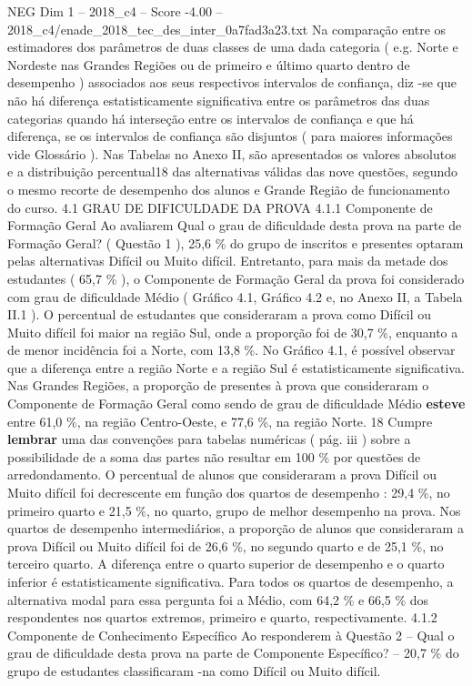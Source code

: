\begin{textsample}{NEG Dim 1 – 2018\_c4 – Score -4.00 – 2018\_c4/enade\_2018\_tec\_des\_inter\_0a7fad3a23.txt}
Na comparação entre os estimadores dos parâmetros de duas classes de uma dada categoria ( e.g.
Norte e Nordeste nas Grandes Regiões ou de primeiro e último quarto dentro de desempenho ) associados aos seus respectivos intervalos de confiança, diz -se que não há diferença estatisticamente significativa entre os parâmetros das duas categorias quando há interseção entre os intervalos de confiança e que há diferença, se os intervalos de confiança são disjuntos ( para maiores informações vide Glossário ).
Nas Tabelas no Anexo II, são apresentados os valores absolutos e a distribuição percentual18 das alternativas válidas das nove questões, segundo o mesmo recorte de desempenho dos alunos e Grande Região de funcionamento do curso. 4.1 GRAU DE DIFICULDADE DA PROVA 4.1.1 Componente de Formação Geral Ao avaliarem Qual o grau de dificuldade desta prova na parte de Formação Geral? ( Questão 1 ), 25,6 \% do grupo de inscritos e presentes optaram pelas alternativas Difícil ou Muito difícil.
Entretanto, para mais da metade dos estudantes ( 65,7 \% ), o Componente de Formação Geral da prova foi considerado com grau de dificuldade Médio ( Gráfico 4.1, Gráfico 4.2 e, no Anexo II, a Tabela II.1 ).
O percentual de estudantes que consideraram a prova como Difícil ou Muito difícil foi maior na região Sul, onde a proporção foi de 30,7 \%, enquanto a de menor incidência foi a Norte, com 13,8 \%.
No Gráfico 4.1, é possível observar que a diferença entre a região Norte e a região Sul é estatisticamente significativa.
Nas Grandes Regiões, a proporção de presentes à prova que consideraram o Componente de Formação Geral como sendo de grau de dificuldade Médio \textbf{esteve} entre 61,0 \%, na região Centro-Oeste, e 77,6 \%, na região Norte. 18 Cumpre \textbf{lembrar} uma das convenções para tabelas numéricas ( pág. iii ) sobre a possibilidade de a soma das partes não resultar em 100 \% por questões de arredondamento.
O percentual de alunos que consideraram a prova Difícil ou Muito difícil foi decrescente em função dos quartos de desempenho : 29,4 \%, no primeiro quarto e 21,5 \%, no quarto, grupo de melhor desempenho na prova.
Nos quartos de desempenho intermediários, a proporção de alunos que consideraram a prova Difícil ou Muito difícil foi de 26,6 \%, no segundo quarto e de 25,1 \%, no terceiro quarto.
A diferença entre o quarto superior de desempenho e o quarto inferior é estatisticamente significativa.
Para todos os quartos de desempenho, a alternativa modal para essa pergunta foi a Médio, com 64,2 \% e 66,5 \% dos respondentes nos quartos extremos, primeiro e quarto, respectivamente. 4.1.2 Componente de Conhecimento Específico Ao responderem à Questão 2 – Qual o grau de dificuldade desta prova na parte de Componente Específico? – 20,7 \% do grupo de estudantes classificaram -na como Difícil ou Muito difícil.

\end{textsample}
